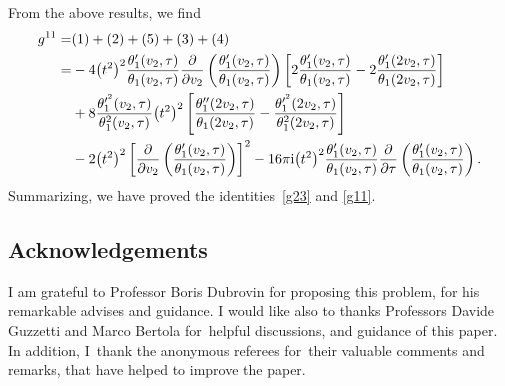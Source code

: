 \documentclass[pdftex]{sigma}%
\numberwithin{equation}{section}
\begin{document}
 From the above results, we find
\begin{align*}
g^{11}=&(1)+(2)+(5)+(3)+(4)\\
=&-4\big(t^2\big)^2\frac{\theta_1^{\prime}(v_2,\tau)}{\theta_1(v_2,\tau)}\frac{\partial}{\partial v_2}\left(\frac{\theta_1^{\prime}(v_2,\tau)}{\theta_1(v_2,\tau)}\right)\left[ 2\frac{\theta_1^{\prime}(v_2,\tau)}{\theta_1(v_2,\tau)} -2\frac{\theta_1^{\prime}(2v_2,\tau)}{\theta_1(2v_2,\tau)}\right]\\
&+8\frac{\theta_1^{\prime^2}(v_2,\tau)}{\theta_1^2(v_2,\tau)}\big(t^2\big)^2\left[\frac{\theta_1^{\prime\prime}(2v_2,\tau)}{\theta_1(2v_2,\tau)}-\frac{\theta_1^{\prime^2}(2v_2,\tau)}{\theta_1^2(2v_2,\tau)}\right]\\
&-2\big(t^2\big)^2\left[\frac{\partial}{\partial v_2}\left(\frac{\theta_1^{\prime}(v_2,\tau)}{\theta_1(v_2,\tau)}\right)\right]^2-16\pi {\rm i}\big(t^2\big)^2\frac{\theta_1^{\prime}(v_2,\tau)}{\theta_1(v_2,\tau)}\frac{\partial}{\partial \tau}\left(\frac{\theta_1^{\prime}(v_2,\tau)}{\theta_1(v_2,\tau)}\right).
\end{align*}
Summarizing, we have proved the identities~\eqref{g23} and \eqref{g11}.


\subsection*{Acknowledgements}
I am grateful to Professor Boris Dubrovin for proposing this problem, for his remarkable advi\-ses and guidance. I would like also to thanks Professors Davide Guzzetti and Marco Bertola for~helpful discussions, and guidance of this paper. In addition, I~thank the anonymous referees for~their valuable comments and remarks, that have helped to improve the paper.
\end{document}
